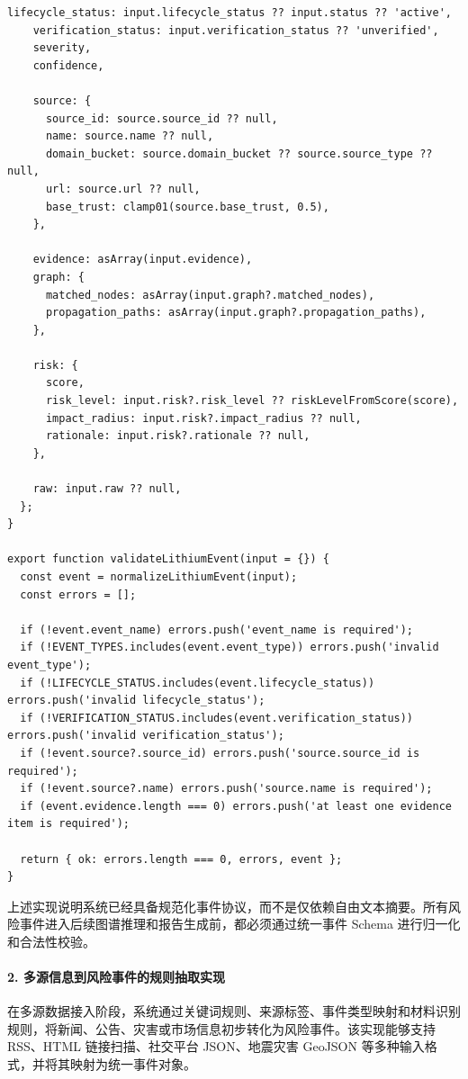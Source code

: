\documentclass[12pt,a4paper]{article}
\begin{document}
\begin{lstlisting}[style=projectcode,caption={风险事件标准化与 Schema 校验核心实现}]
    lifecycle_status: input.lifecycle_status ?? input.status ?? 'active',
    verification_status: input.verification_status ?? 'unverified',
    severity,
    confidence,

    source: {
      source_id: source.source_id ?? null,
      name: source.name ?? null,
      domain_bucket: source.domain_bucket ?? source.source_type ?? null,
      url: source.url ?? null,
      base_trust: clamp01(source.base_trust, 0.5),
    },

    evidence: asArray(input.evidence),
    graph: {
      matched_nodes: asArray(input.graph?.matched_nodes),
      propagation_paths: asArray(input.graph?.propagation_paths),
    },

    risk: {
      score,
      risk_level: input.risk?.risk_level ?? riskLevelFromScore(score),
      impact_radius: input.risk?.impact_radius ?? null,
      rationale: input.risk?.rationale ?? null,
    },

    raw: input.raw ?? null,
  };
}

export function validateLithiumEvent(input = {}) {
  const event = normalizeLithiumEvent(input);
  const errors = [];

  if (!event.event_name) errors.push('event_name is required');
  if (!EVENT_TYPES.includes(event.event_type)) errors.push('invalid event_type');
  if (!LIFECYCLE_STATUS.includes(event.lifecycle_status)) errors.push('invalid lifecycle_status');
  if (!VERIFICATION_STATUS.includes(event.verification_status)) errors.push('invalid verification_status');
  if (!event.source?.source_id) errors.push('source.source_id is required');
  if (!event.source?.name) errors.push('source.name is required');
  if (event.evidence.length === 0) errors.push('at least one evidence item is required');

  return { ok: errors.length === 0, errors, event };
}
\end{lstlisting}

上述实现说明系统已经具备规范化事件协议，而不是仅依赖自由文本摘要。所有风险事件进入后续图谱推理和报告生成前，都必须通过统一事件 Schema 进行归一化和合法性校验。

\paragraph{2. 多源信息到风险事件的规则抽取实现}

在多源数据接入阶段，系统通过关键词规则、来源标签、事件类型映射和材料识别规则，将新闻、公告、灾害或市场信息初步转化为风险事件。该实现能够支持 RSS、HTML 链接扫描、社交平台 JSON、地震灾害 GeoJSON 等多种输入格式，并将其映射为统一事件对象。
\end{document}
